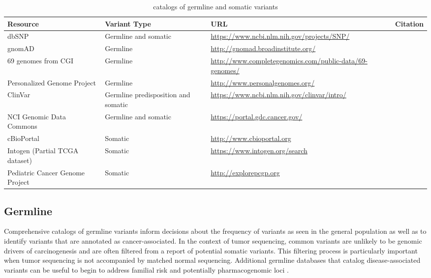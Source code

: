 \documentclass[10pt,letterpaper]{article}
\begin{document}
\begin{table}[p]
\centering
\begin{tabularx}{\textwidth}{XXXp{1.7cm}}
  \hline
Resource & Variant Type & URL & Citation \\
  \hline
  dbSNP & Germline and somatic & \url{https://www.ncbi.nlm.nih.gov/projects/SNP/} & \cite{Sherry2001-li} \\
  gnomAD  & Germline & \url{http://gnomad.broadinstitute.org/} & \cite{Lek2016-bb} \\
  69 genomes from CGI & Germline & \url{http://www.completegenomics.com/public-data/69-genomes/} & \cite{Drmanac2010-od} \\
  Personalized Genome Project & Germline & \url{http://www.personalgenomes.org/} & \cite{Church2005-lr} \\
  ClinVar & Germline predisposition and somatic & \url{https://www.ncbi.nlm.nih.gov/clinvar/intro/} & \cite{Landrum2016-ul} \\
  NCI Genomic Data Commons & Germline and somatic & \url{https://portal.gdc.cancer.gov/} & \cite{Grossman2016-sk} \\
  cBioPortal & Somatic & \url{http://www.cbioportal.org} & \cite{Cerami2012-el,Gao2013-li} \\
  Intogen (Partial TCGA dataset) & Somatic & \url{https://www.intogen.org/search} & \cite{Rubio-Perez2015-ek,Gonzalez-Perez2013-cl} \\
  Pediatric Cancer Genome Project  & Somatic & \url{http://explorepcgp.org} & \cite{Downing2012-do} \\
   \hline
\end{tabularx}
\caption{catalogs of germline and somatic variants}
\label{table:1}
\end{table}

\subsection{Germline}

Comprehensive catalogs of germline variants inform decisions
about the frequency of variants as seen in the general population as
well as to identify variants that are annotated as
cancer-associated. In the context of tumor sequencing, common variants
are unlikely to be genomic drivers of carcinogenesis and are often
filtered from a report of potential somatic variants. This filtering
process is particularly important when tumor sequencing is not
accompanied by matched normal sequencing. Additional germline
databases that catalog disease-associated variants can be useful to
begin to address familial risk and potentially pharmacogenomic loci
\cite{Wheeler2013-dn,Relling2015-ie}.
\end{document}
